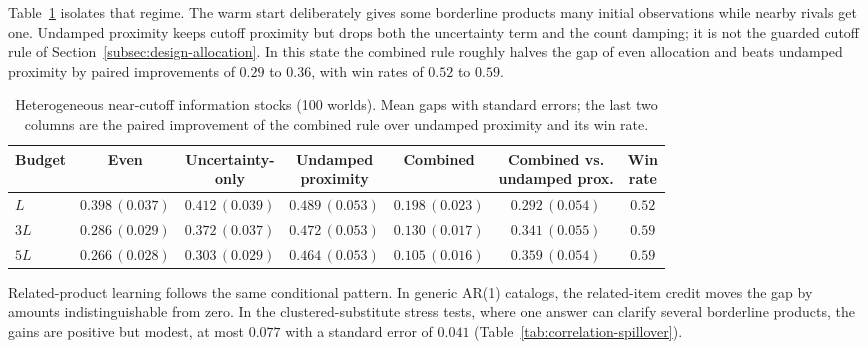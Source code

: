 \documentclass[11pt]{article}
\theoremstyle{definition}
\theoremstyle{remark}
\newcommand{\1}{\mathbf{1}}
\begin{document}
Table~\ref{tab:het-stock} isolates that regime. The warm start
deliberately gives some borderline products many initial observations
while nearby rivals get one. Undamped proximity keeps cutoff proximity
but drops both the uncertainty term and the count damping; it
is not the guarded cutoff rule of
Section~\ref{subsec:design-allocation}. In this state the combined
rule roughly halves the gap of even allocation and beats undamped
proximity by paired improvements of \(0.29\) to \(0.36\), with win
rates of \(0.52\) to \(0.59\).

\begin{table}[h!]
\centering
\scriptsize
\setlength{\tabcolsep}{4pt}
\begin{tabular}{lcccccc}
\toprule
Budget & Even & \shortstack{Uncertainty-\\only} & \shortstack{Undamped\\proximity} & Combined & \shortstack{Combined vs.\\undamped prox.} & \shortstack{Win\\rate} \\
\midrule
$L$  & $0.398\,(0.037)$ & $0.412\,(0.039)$ & $0.489\,(0.053)$ & $0.198\,(0.023)$ & $0.292\,(0.054)$ & $0.52$ \\
$3L$ & $0.286\,(0.029)$ & $0.372\,(0.037)$ & $0.472\,(0.053)$ & $0.130\,(0.017)$ & $0.341\,(0.055)$ & $0.59$ \\
$5L$ & $0.266\,(0.028)$ & $0.303\,(0.029)$ & $0.464\,(0.053)$ & $0.105\,(0.016)$ & $0.359\,(0.054)$ & $0.59$ \\
\bottomrule
\end{tabular}
\caption{Heterogeneous near-cutoff information stocks (100 worlds). Mean gaps with standard errors; the last two columns are the paired improvement of the combined rule over undamped proximity and its win rate.}
\label{tab:het-stock}
\end{table}

Related-product learning follows the same conditional pattern. In
generic AR(1) catalogs, the related-item credit moves the gap by
amounts indistinguishable from zero. In the clustered-substitute stress
tests, where one answer can clarify several borderline products, the
gains are positive but modest, at most \(0.077\) with a standard
error of \(0.041\) (Table~\ref{tab:correlation-spillover}).
\end{document}

